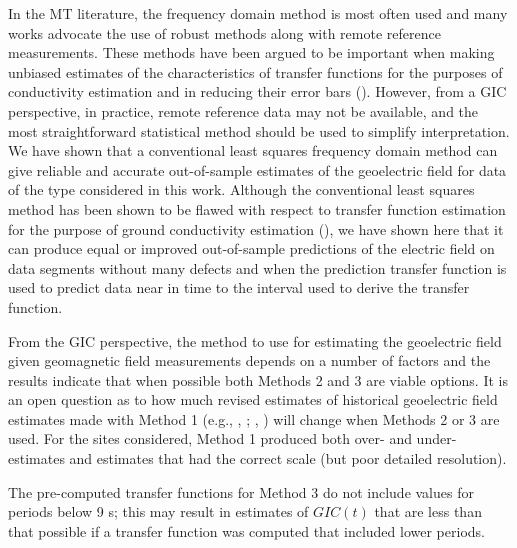\documentclass[12pt]{article}
\newcommand{\citeay}[1]{%
\citeauthor{#1}, \citeyear{#1}%
}
\begin{document}
In the MT literature, the frequency domain method is most often used and many works advocate the use of robust methods along with remote reference measurements.  These methods have been argued to be important when making unbiased estimates of the characteristics of transfer functions for the purposes of conductivity estimation and in reducing their error bars (\cite{Chave2012}).  However, from a GIC perspective, in practice, remote reference data may not be available, and the most straightforward statistical method should be used to simplify interpretation.  We have shown that a conventional least squares frequency domain method can give reliable and accurate out-of-sample estimates of the geoelectric field for data of the type considered in this work.  Although the conventional least squares method has been shown to be flawed with respect to transfer function estimation for the purpose of ground conductivity estimation (\cite{Egbert1986}), we have shown here that it can produce equal or improved out-of-sample predictions of the electric field on data segments without many defects and when the prediction transfer function is used to predict data near in time to the interval used to derive the transfer function.


From the GIC perspective, the method to use for estimating the geoelectric field given geomagnetic field measurements depends on a number of factors and the results indicate that when possible both Methods 2 and 3 are viable options.  It is an open question as to how much revised estimates of historical geoelectric field estimates made with Method 1 (e.g., \citeay{Pulkkinen2012}; \citeay{Wei2013}) will change when Methods 2 or 3 are used.  For the sites considered, Method 1 produced both over- and under-estimates and estimates that had the correct scale (but poor detailed resolution).

The pre-computed transfer functions for Method 3 do not include values for periods below 9 s; this may result in estimates of $GIC(t)$ that are less than that possible if a transfer function was computed that included lower periods. 
\end{document}
